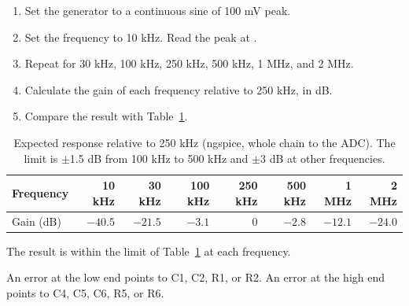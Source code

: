 \clearpage
\begin{samepage}
\begin{enumerate}
\item Set the generator to a continuous sine of 100 mV peak.
\item Set the frequency to 10 kHz. Read the peak at .
\item Repeat for 30 kHz, 100 kHz, 250 kHz, 500 kHz, 1 MHz, and 2 MHz.
\item Calculate the gain of each frequency relative to 250 kHz, in dB.
\item Compare the result with Table~\ref{tab:sweep}.
\end{enumerate}
\begin{table}[H]
\caption{Expected response relative to 250 kHz (ngspice, whole chain to the ADC). The limit is $\pm$1.5 dB from 100 kHz to 500 kHz and $\pm$3 dB at other frequencies.}\label{tab:sweep}
\small\begin{tabular}{@{}lrrrrrrr@{}}
\toprule Frequency & 10 kHz & 30 kHz & 100 kHz & 250 kHz & 500 kHz & 1 MHz & 2 MHz\\\midrule
Gain (dB) & $-40.5$ & $-21.5$ & $-3.1$ & 0 & $-2.8$ & $-12.1$ & $-24.0$\\
\bottomrule\end{tabular}
\end{table}
\begin{pass}The result is within the limit of Table~\ref{tab:sweep} at each frequency.\end{pass}
\begin{fail}An error at the low end points to C1, C2, R1, or R2. An error at the high end points to C4, C5, C6, R5, or R6.\end{fail}
\end{samepage}

